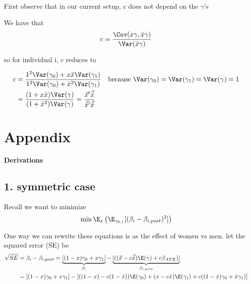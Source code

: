 First observe that in our current setup, $c$ does not depend on the $\gamma$'s

We have that
\begin{align*}
	c = \frac{\Cov (x \gamma, \bar{x} \gamma)}{ \Var( \bar{x} \gamma )}
\end{align*} 

so for individual i, $c$ reduces to


\begin{align*}
	c &= \frac{1^2\Var(\gamma_0) + x \bar{x} \Var(\gamma_1)}{1^2\Var(\gamma_0) + \bar{x}^2\Var(\gamma_1)} \quad \text{because $\Var(\gamma_0) = \Var(\gamma_1) = \Var(\gamma) = 1$} \\
	  &= \frac{(1 + x \bar{x})\Var(\gamma)}{(1 + \bar{x}^2)\Var(\gamma)} = \frac{\vec{x}' \vec{\bar{x}}}{\vec{\bar{x}}' \vec{\bar{x}}}
\end{align*} 




\section{Appendix}

\begin{center}
	{\large \bf Derivations }
\end{center}

\subsection*{1. symmetric case}

Recall we want to minimize
\begin{align*}
\min \E_x \left(\E_{\gamma_{0,1}}[(\beta_i - \beta_{i,post})^2]\right)
\end{align*}

One way we can rewrite these equations is as the effect of women vs men.
let the squared error (SE) be
\begin{align*}
	\sqrt{SE} &= \beta_i -  \beta_{i,post} = \underbrace{[(1-x) \gamma_0 + x \gamma_1]}_{\text{$\beta_i$}}  - \underbrace{[((\vec{x} - c \vec{\bar{x}})\E(\gamma) + c \beta_{ATE})]}_\text{$\beta_{i,post}$} \\
	  &= [(1-x) \gamma_0 + x \gamma_1]  - [((1-x) - c (1 - \bar{x})) \E(\gamma_0) + (x - c \bar{x})\E(\gamma_1) + c((1-\bar{x}) \gamma_0 + \bar{x} \gamma_1)] \\
\end{align*}

